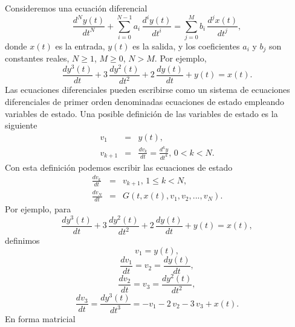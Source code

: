 Consideremos una ecuaci\'{o}n diferencial
\begin{equation}
  \frac{d^{N} y(t)}{dt^{N}} + 
  \sum_{i=0}^{N-1} a_{i} \, \frac{d^{i} y(t)}{dt^{i}} = 
  \sum_{j=0}^{M} b_{i} \, \frac{d^{j} x(t)}{dt^{j}},
\end{equation}
donde $x(t)$ es la entrada, $y(t)$ es la salida, y los coeficientes
$a_{i}$ y $b_{j}$ son constantes reales, $N \geq 1$, $M \geq
0$, $N > M$. Por ejemplo,
\begin{equation}
\frac{dy^{3}(t)}{dt} + 3 \, \frac{dy^{2}(t)}{dt^{2}} 
+ 2 \, \frac{dy(t)}{dt}
+ y(t) 
= x(t).
\end{equation}
Las ecuaciones diferenciales pueden escribirse como un sistema de ecuaciones
diferenciales de primer orden denominadas ecuaciones de estado empleando 
variables de estado. 
Una posible definici\'{o}n de las variables de estado es la siguiente
\begin{eqnarray}
  v_{1}   &=& y(t),                                               \\
  v_{k+1} &=& \frac{dv_{k}}{dt} = \frac{d^{k}y}{dt^{k}},  \, 0 < k < N .
\end{eqnarray}
Con esta definici\'{o}n podemos escribir las ecuaciones de estado
\begin{eqnarray}
  \frac{dv_{k}}{dt} &=& v_{k+1},  \, 1 \leq k < N,  \\
  \frac{dv_{N}}{dt} &=& G(t, x(t), v_{1}, v_{2},...,v_{N}).
\end{eqnarray}
Por ejemplo, para
\begin{equation}
\frac{dy^{3}(t)}{dt} + 3 \, \frac{dy^{2}(t)}{dt^{2}} 
+ 2 \, \frac{dy(t)}{dt}
+ y(t) 
= x(t),
\end{equation}
definimos
\begin{equation}
v_{1} = y(t),
\end{equation}
\begin{equation}
\frac{dv_{1}}{dt} = v_{2} = \frac{dy(t)}{dt},
\end{equation}
\begin{equation}
\frac{dv_{2}}{dt} = v_{3} = \frac{dy^{2}(t)}{dt^{2}},
\end{equation}
\begin{equation}
\frac{dv_{3}}{dt} = \frac{dy^{3}(t)}{dt^{3}} = -v_{1} - 2 \, v_{2} - 3 \, v_{3} + x(t).
\end{equation}
En forma matricial
